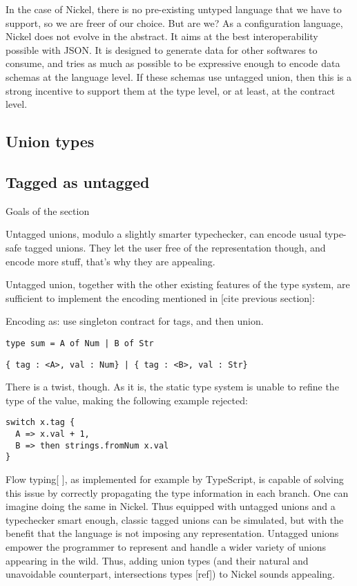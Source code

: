 \documentclass{article}
\begin{document}
In the case of Nickel, there is no pre-existing untyped language that we have to
support, so we are freer of our choice. But are we? As a configuration language,
Nickel does not evolve in the abstract. It aims at the best interoperability
possible with JSON. It is designed to generate data for other softwares to
consume, and tries as much as possible to be expressive enough to encode data
schemas at the language level. If these schemas use untagged union, then this is
a strong incentive to support them at the type level, or at least, at the
contract level.

\subsection{Union types}

\subsection{Tagged as untagged}
\color{red}Goals of the section

Untagged unions, modulo a slightly smarter typechecker, can encode usual type-safe
tagged unions. They let the user free of the representation though, and encode
more stuff, that's why they are appealing.\vspace{0.5cm}\color{black}

Untagged union, together with the other existing features of the type system,
are sufficient to implement the encoding mentioned in [cite previous section]:

Encoding as: use singleton contract for tags, and then union.
\begin{lstlisting}
type sum = A of Num | B of Str
\end{lstlisting}

\begin{lstlisting}
{ tag : <A>, val : Num} | { tag : <B>, val : Str}
\end{lstlisting}

There is a twist, though. As it is, the static type system is unable to refine
the type of the value, making the following example rejected: 

\begin{lstlisting}
switch x.tag {
  A => x.val + 1,
  B => then strings.fromNum x.val
}
\end{lstlisting}

Flow typing[ ], as implemented for example by TypeScript, is capable of solving
this issue by correctly propagating the type information in each branch. One can
imagine doing the same in Nickel. Thus equipped with untagged unions and a
typechecker smart enough, classic tagged unions can be simulated, but with the
benefit that the language is not imposing any representation. Untagged unions
empower the programmer to represent and handle a wider variety of unions
appearing in the wild. Thus, adding union types (and their natural and
unavoidable counterpart, intersections types [ref]) to Nickel sounds appealing.
\end{document}
